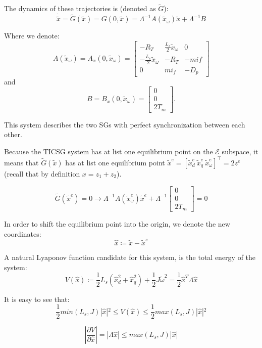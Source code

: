 \documentclass[letterpaper, 10 pt, conference]{ieeeconf}  %
\begin{document}
The dynamics of these trajectories is (denoted as $\tilde{G}$):
$$
\dot{\tilde{x}}=\tilde{G}(\tilde{x})=G(0,\tilde{x})=
 \Lambda^{-1} A\left( \tilde{x}_\omega \right) \tilde{x}+\Lambda^{-1} B 
$$

Where we denote:
$$
A\left( \tilde{x}_\omega \right)=A_x\left(0, \tilde{x}_\omega \right) =  
 \left[\begin{array}{ccc}
-R_T & \frac{L_{s}}{2}\tilde{x}_{\omega} & 0\\
-\frac{L_{s}}{2}\tilde{x}_{\omega} & -R_T & -mif\\
0 & mi_{f} & -D_{p}
\end{array}\right]
$$
and
$$
B = B_x\left(0, \tilde{x}_\omega \right)  =  
 \left[\begin{array}{c}
0\\
0\\
2T_{m}
\end{array}\right].
$$

This system describes the two SGs with perfect synchronization between each other.

Because the TICSG system has at list one equilibrium point on the $\mathscr{E}$ subspace, it means that $\tilde{G}(\tilde{x})$ has at list one equilibrium point 
$\tilde{x}^{e}=\left[\tilde{x}_{d}^{e}\ \tilde{x}_{q}^{e}\ \tilde{x}_{\omega}^{e} \right]^\top = 2z^e$ (recall that by definition $x = z_1 + z_2$).

\begin{equation}
\tilde{G}(\tilde{x}^{e})=0\rightarrow\varLambda^{-1}A(\tilde{x}_{\omega}^{e})\tilde{x}^{e}+\varLambda^{-1}\left[\begin{array}{c}
0\\
0\\
2T_{m}
\end{array}\right]=0\label{eq:G_at_equilibrium}
\end{equation}

In order to shift the equilibrium point into the origin, we denote the new  coordinates:
$$
\hat{x}\coloneqq\tilde{x}-\tilde{x}^{e}
$$

A natural Lyaponov function candidate for this system, is the total energy of the system:
$$
V(\hat{x})\coloneqq\frac{1}{2}L_{s}\left(\hat{x}_{d}^{2}+\hat{x}_{q}^{2}\right)+\frac{1}{2}J\tilde{\omega}^{2}=\frac{1}{2}\hat{x}^{T}\varLambda\hat{x}
$$

It is easy to see that:
$$
\frac{1}{2} min(L_{s},J)|\hat{x}|{}^{2}\leq V(\hat{x})\leq \frac{1}{2} max(L_{s},J)|\hat{x}|{}^{2}
$$

$$
\left|\frac{\partial V}{\partial\hat{x}}\right|=\left|\varLambda\hat{x}\right|\leq max(L_{s},J)\left|\hat{x}\right|
$$
\end{document}
